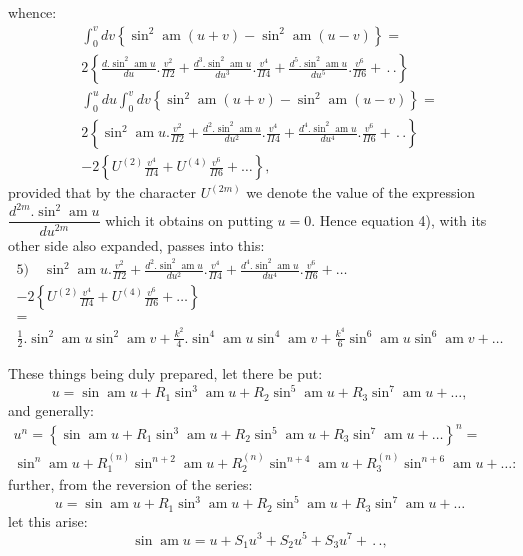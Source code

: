 \documentclass{article}
\begin{document}
whence:
\[
\begin{gathered}
\int_{0}^{v}dv\left\{\sin^{2}\operatorname{am}(u+v)-\sin^{2}\operatorname{am}(u-v)\right\}=\\[1.5ex]
2\left\{\frac{d.\sin^{2}\operatorname{am}u}{du}.\frac{v^{2}}{\Pi 2}+\frac{d^{3}.\sin^{2}\operatorname{am}u}{du^{3}}.\frac{v^{4}}{\Pi 4}+\frac{d^{5}.\sin^{2}\operatorname{am}u}{du^{5}}.\frac{v^{6}}{\Pi 6}+\,.\,.\right\}\\[1.5ex]
\int_{0}^{u}du\int_{0}^{v}dv\left\{\sin^{2}\operatorname{am}(u+v)-\sin^{2}\operatorname{am}(u-v)\right\}=\\[1.5ex]
2\left\{\sin^{2}\operatorname{am}u.\frac{v^{2}}{\Pi 2}+\frac{d^{2}.\sin^{2}\operatorname{am}u}{du^{2}}.\frac{v^{4}}{\Pi 4}+\frac{d^{4}.\sin^{2}\operatorname{am}u}{du^{4}}.\frac{v^{6}}{\Pi 6}+\,.\,.\right\}\\[1.5ex]
-2\left\{U^{(2)}\frac{v^{4}}{\Pi 4}+U^{(4)}\frac{v^{6}}{\Pi 6}+\ldots\right\},
\end{gathered}
\]
provided that by the character $U^{(2m)}$ we denote the value of the expression $\dfrac{d^{2m}.\sin^{2}\operatorname{am}u}{du^{2m}}$ which it obtains on putting $u=0$. Hence equation 4), with its other side also expanded, passes into this:
\[
\begin{gathered}
\text{5)}\quad\sin^{2}\operatorname{am}u.\frac{v^{2}}{\Pi 2}+\frac{d^{2}.\sin^{2}\operatorname{am}u}{du^{2}}.\frac{v^{4}}{\Pi 4}+\frac{d^{4}.\sin^{2}\operatorname{am}u}{du^{4}}.\frac{v^{6}}{\Pi 6}+\ldots\\[1.5ex]
-2\left\{U^{(2)}\frac{v^{4}}{\Pi 4}+U^{(4)}\frac{v^{6}}{\Pi 6}+\ldots\right\}\\[1.5ex]
=\\[1.5ex]
\frac{1}{2}.\sin^{2}\operatorname{am}u\sin^{2}\operatorname{am}v+\frac{k^{2}}{4}.\sin^{4}\operatorname{am}u\sin^{4}\operatorname{am}v+\frac{k^{4}}{6}\sin^{6}\operatorname{am}u\sin^{6}\operatorname{am}v+\ldots
\end{gathered}
\]

These things being duly prepared, let there be put:
\[
u=\sin\operatorname{am}u+R_{1}\sin^{3}\operatorname{am}u+R_{2}\sin^{5}\operatorname{am}u+R_{3}\sin^{7}\operatorname{am}u+\ldots,
\]
and generally:
\[
\begin{gathered}
u^{n}=\left\{\sin\operatorname{am}u+R_{1}\sin^{3}\operatorname{am}u+R_{2}\sin^{5}\operatorname{am}u+R_{3}\sin^{7}\operatorname{am}u+\ldots\right\}^{n}=\\[1.5ex]
\sin^{n}\operatorname{am}u+R_{1}^{(n)}\sin^{n+2}\operatorname{am}u+R_{2}^{(n)}\sin^{n+4}\operatorname{am}u+R_{3}^{(n)}\sin^{n+6}\operatorname{am}u+\ldots:
\end{gathered}
\]
further, from the reversion of the series:
\[
u=\sin\operatorname{am}u+R_{1}\sin^{3}\operatorname{am}u+R_{2}\sin^{5}\operatorname{am}u+R_{3}\sin^{7}\operatorname{am}u+\ldots
\]
let this arise:
\[
\sin\operatorname{am}u=u+S_{1}u^{3}+S_{2}u^{5}+S_{3}u^{7}+\,.\,.,
\]
\end{document}
